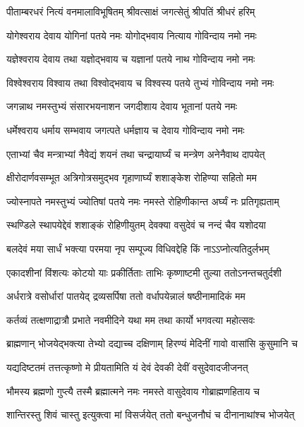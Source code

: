 \twolineshloka
{पीताम्बरधरं नित्यं वनमालाविभूषितम्}
{श्रीवत्साक्षं जगत्सेतुं श्रीपतिं श्रीधरं हरिम्}%


\twolineshloka
{योगेश्वराय देवाय योगिनां पतये नमः}
{योगोद्भवाय नित्याय गोविन्दाय नमो नमः}%


\twolineshloka
{यज्ञेश्वराय देवाय तथा यज्ञोद्भवाय च}
{यज्ञानां पतये नाथ गोविन्दाय नमो नमः}%


\twolineshloka
{विश्वेश्वराय विश्वाय तथा विश्वोद्भवाय च}
{विश्वस्य पतये तुभ्यं गोविन्दाय नमो नमः}%


\twolineshloka
{जगन्नाथ नमस्तुभ्यं संसारभयनाशन}
{जगदीशाय देवाय भूतानां पतये नमः}%


\twolineshloka
{धर्मेश्वराय धर्माय सम्भवाय जगत्पते}
{धर्मज्ञाय च देवाय गोविन्दाय नमो नमः}%


\twolineshloka
{एताभ्यां चैव मन्त्राभ्यां नैवेद्यं शयनं तथा}
{चन्द्रायार्घ्यं च मन्त्रेण अनेनैवाथ दापयेत्}%


\twolineshloka
{क्षीरोदार्णवसम्भूत अत्रिगोत्रसमुद्भव}
{गृहाणार्घ्यं शशाङ्केश रोहिण्या सहितो मम}%


\twolineshloka
{ज्योस्नापते नमस्तुभ्यं ज्योतिषां पतये नमः}
{नमस्ते रोहिणीकान्त अर्घ्यं नः प्रतिगृह्यताम्}%


\twolineshloka
{स्थण्डिले स्थापयेद्देवं शशाङ्कं रोहिणीयुतम्}
{देवक्या वसुदेवं च नन्दं चैव यशोदया}%


\twolineshloka
{बलदेवं मया सार्धं भक्त्या परमया नृप}
{सम्पूज्य विधिवद्देहि किं नाऽऽप्नोत्यतिदुर्लभम्}%


\twolineshloka
{एकादशीनां विंशत्यः कोटयो याः प्रकीर्तिताः}
{ताभिः कृष्णाष्टमी तुल्या ततोऽनन्तचतुर्दशी}%


\twolineshloka
{अर्धरात्रे वसोर्धारां पातयेद् द्रव्यसर्पिषा}
{ततो वर्धापयेन्नालं षष्ठीनामादिकं मम}%


\twolineshloka
{कर्तव्यं तत्क्षणाद्रात्रौ प्रभाते नवमीदिने}
{यथा मम तथा कार्यो भगवत्या महोत्सवः}%


\twolineshloka
{ब्राह्मणान् भोजयेद्भक्त्या तेभ्यो दद्याच्च दक्षिणाम्}
{हिरण्यं मेदिनीं गावो वासांसि कुसुमानि च}%


\twolineshloka
{यद्यदिष्टतमं तत्तत्कृष्णो मे प्रीयतामिति}
{यं देवं देवकी देवीं वसुदेवादजीजनत्}%


\twolineshloka
{भौमस्य ब्रह्मणो गुप्त्यै तस्मै ब्रह्मात्मने नमः}
{नमस्ते वासुदेवाय गोब्राह्मणहिताय च}%


\twolineshloka
{शान्तिरस्तु शिवं चास्तु इत्युक्त्वा मां विसर्जयेत्}
{ततो बन्धुजनौघं च दीनानाथांश्च भोजयेत्}%


